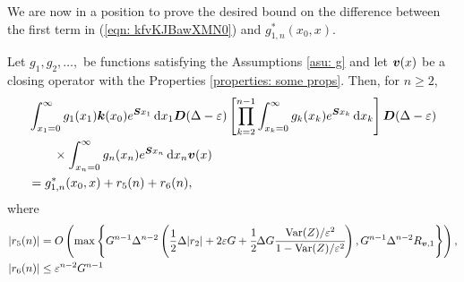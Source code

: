 We are now in a position to prove the desired bound on the difference between the first term in (\ref{eqn: kfvKJBawXMN0}) and \(g^*_{1,n}(x_0,x)\).
\begin{lem}\label{lem: lst convergence}
	Let \(g_1,g_2,\dots,\) be functions satisfying the Assumptions \ref{asu: g} and let \(\boldsymbol v(x)\) be a closing operator with the Properties \ref{properties: some props}. Then, for \(n\geq 2\),  
	\begin{align}
		&\int_{x_1=0}^\infty g_1(x_1) \boldsymbol k(x_0) e^{\boldsymbol{S}x_1}\, \mathrm{d} x_1 \boldsymbol D(\Delta-\varepsilon)
            	\left[\prod_{k=2}^{n-1}\int_{x_k=0}^\infty g_k(x_k) e^{\boldsymbol{S}x_k} \, \mathrm{d} x_k \right]
		\boldsymbol D(\Delta-\varepsilon) \nonumber 
		\\&\qquad\times\int_{x_n=0}^\infty g_{n}(x_n) e^{\boldsymbol{S}x_n} \, \mathrm{d} x_n {\boldsymbol v}(x) \nonumber 
		\\& =g^{*}_{1,n}(x_0,x) + r_5(n) + r_6(n), \label{eqn: rhs g 2}
	\end{align}
	where  
	\begin{align*}
		|r_5(n)|&= O\left(\max\left\{G^{n-1}\Delta^{n-2}\left(\frac{1}{2}\Delta|r_2 |+ 2\varepsilon G 
		+ \cfrac{1}{2}\Delta G\cfrac{\mathrm{Var}(Z)/\varepsilon^2}{1-\mathrm{Var}(Z)/\varepsilon^2}\right),
		G^{n-1}\Delta^{n-2}R_{{\boldsymbol v},1}\right\}\right),
		\\|r_6(n)| &\leq \varepsilon^{n-2}G^{n-1}
	\end{align*}
\end{lem}
